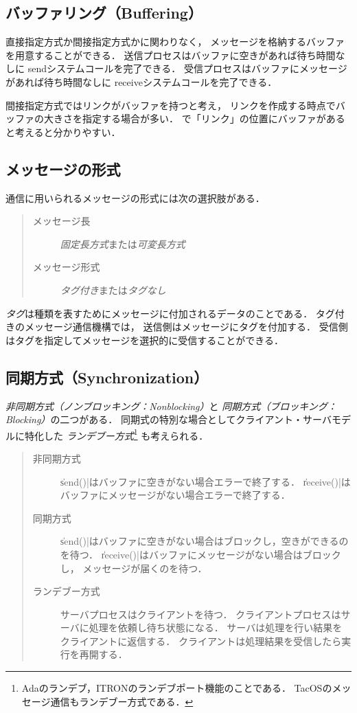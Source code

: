 \subsection{バッファリング（Buffering）}
直接指定方式か間接指定方式かに関わりなく，
メッセージを格納するバッファを用意することができる．
送信プロセスはバッファに空きがあれば待ち時間なしに
sendシステムコールを完了できる．
受信プロセスはバッファにメッセージがあれば待ち時間なしに
receiveシステムコールを完了できる．

間接指定方式ではリンクがバッファを持つと考え，
リンクを作成する時点でバッファの大きさを指定する場合が多い．
で「リンク」の位置にバッファがあると考えると分かりやすい．

\subsection{メッセージの形式}
通信に用いられるメッセージの形式には次の選択肢がある．

\begin{quote}
  \begin{description}
  \item [メッセージ長] \emph{固定長方式}または\emph{可変長方式}
  \item [メッセージ形式] \emph{タグ付き}または\emph{タグなし}
  \end{description}
\end{quote}

\emph{タグ}は種類を表すためにメッセージに付加されるデータのことである．
タグ付きのメッセージ通信機構では，
送信側はメッセージにタグを付加する．
受信側はタグを指定してメッセージを選択的に受信することができる．

\subsection{同期方式（Synchronization）}
\emph{非同期方式（ノンブロッキング：Nonblocking）}と
\emph{同期方式（ブロッキング：Blocking）}の二つがある．
同期式の特別な場合としてクライアント・サーバモデルに特化した
\emph{ランデブー方式}\footnote{
  Adaのランデブ，ITRONのランデブポート機能のことである．
  TacOSのメッセージ通信もランデブー方式である．}
も考えられる．

\begin{quote}
  \begin{description}
  \item [非同期方式]
    \|send()|はバッファに空きがない場合エラーで終了する．
    \|receive()|はバッファにメッセージがない場合エラーで終了する．
  \item [同期方式]
    \|send()|はバッファに空きがない場合はブロックし，空きができるのを待つ．
    \|receive()|はバッファにメッセージがない場合はブロックし，
    メッセージが届くのを待つ．
  \item [ランデブー方式]
    サーバプロセスはクライアントを待つ．
    クライアントプロセスはサーバに処理を依頼し待ち状態になる．
    サーバは処理を行い結果をクライアントに返信する．
    クライアントは処理結果を受信したら実行を再開する．
  \end{description}
\end{quote}

